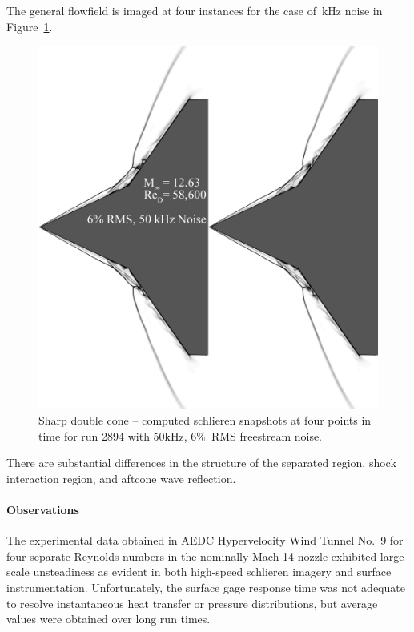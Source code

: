 The general flowfield is imaged at four instances for the case of~\unit[50]{kHz} noise in Figure~\ref{fig:double_cone_AEDC_2894_unsteady_50kHz_6percent}.
\begin{figure}[hbtp]
  \begin{center}
    \includegraphics[width=\textwidth]{figures/aedc_double_cone/2894/2894_50kHz_6RMS}
    \caption{Sharp double cone -- computed schlieren snapshots at four points in time for run 2894 with \unit{50}{kHz}, 6\%~RMS freestream noise.\label{fig:double_cone_AEDC_2894_unsteady_50kHz_6percent}}
  \end{center}
\end{figure}
There are substantial differences in the structure of the separated region, shock interaction region, and aftcone wave reflection.



\clearpage
\paragraph{Observations}
The experimental data obtained in AEDC Hypervelocity Wind Tunnel No.~9 for four separate Reynolds numbers in the nominally Mach 14 nozzle exhibited large-scale unsteadiness as evident in both high-speed schlieren imagery and surface instrumentation.  Unfortunately, the surface gage response time was not adequate to resolve instantaneous heat transfer or pressure distributions, but average values were obtained over long run times.

